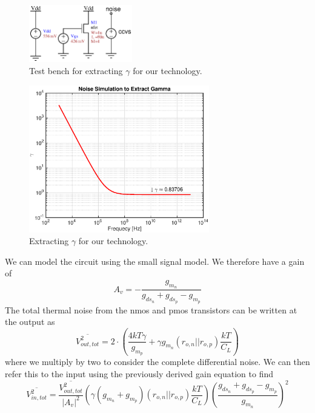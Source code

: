 \documentclass[letterpaper, notitlepage]{revtex4-1}
\begin{document}
\begin{figure}[h]
\begin{center}
\includegraphics[width=0.4\textwidth]{GammaTest.eps}
\caption{Test bench for extracting $\gamma$ for our technology.}
\label{fig:GammaTest}
\end{center}
\end{figure}
\begin{figure}[h]
\begin{center}
\includegraphics[width=0.7\textwidth]{Gamma.eps}
\caption{Extracting $\gamma$ for our technology.}
\label{fig:Gamma}
\end{center}
\end{figure}
We can model the circuit using the small signal model. We therefore have a gain of
\begin{equation}
A_v=-\frac{g_{m_n}}{g_{ds_{n}}+g_{ds_{p}}-g_{m_p}}
\end{equation}
The total thermal noise from the nmos and pmos transistors can be written at the output as
\begin{equation}
\overline{V_{out,tot}^2}=2\cdot\left(\frac{4kT\gamma}{g_{m_p}}+\gamma g_{m_n}\left(r_{o,n}||r_{o,p}\right)\frac{kT}{C_L}\right)
\end{equation}
where we multiply by two to consider the complete differential noise. We can then refer this to the input using the previously derived gain equation to find
\begin{equation}
\overline{V^2_{in,tot}}=\frac{\overline{V_{out,tot}^2}}{\left|A_v\right|^2}\left(\gamma\left(g_{m_n}+g_{m_p}\right)\left(r_{o,n}||r_{o,p}\right)\frac{kT}{C_L}\right)\left(\frac{g_{ds_{n}}+g_{ds_{p}}-g_{m_p}}{g_{m_n}}\right)^2
\end{equation}
\end{document}
